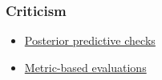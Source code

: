 \subsubsection{Criticism}

\begin{itemize}
  \item \href{tut_PPC.html}{Posterior predictive checks}
  \item \href{tut_metric_eval.html}{Metric-based evaluations}
\end{itemize}
